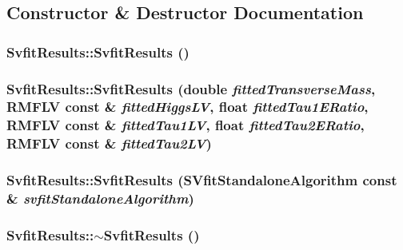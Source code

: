 \subsection{Constructor \& Destructor Documentation}
\hypertarget{classSvfitResults_aacb68d5010cb4ca046f01d846c074fe7}{
\subsubsection[{SvfitResults}]{\setlength{\rightskip}{0pt plus 5cm}SvfitResults::SvfitResults ()}}
\label{classSvfitResults_aacb68d5010cb4ca046f01d846c074fe7}
\hypertarget{classSvfitResults_a8331554fc6ab67e2a2856c61f8b2286a}{
\subsubsection[{SvfitResults}]{\setlength{\rightskip}{0pt plus 5cm}SvfitResults::SvfitResults (double {\em fittedTransverseMass}, \/  RMFLV const \& {\em fittedHiggsLV}, \/  float {\em fittedTau1ERatio}, \/  RMFLV const \& {\em fittedTau1LV}, \/  float {\em fittedTau2ERatio}, \/  RMFLV const \& {\em fittedTau2LV})}}
\label{classSvfitResults_a8331554fc6ab67e2a2856c61f8b2286a}
\hypertarget{classSvfitResults_a949205ecda5ead5d8e5bce308e2a9880}{
\subsubsection[{SvfitResults}]{\setlength{\rightskip}{0pt plus 5cm}SvfitResults::SvfitResults (SVfitStandaloneAlgorithm const \& {\em svfitStandaloneAlgorithm})}}
\label{classSvfitResults_a949205ecda5ead5d8e5bce308e2a9880}
\hypertarget{classSvfitResults_a5b9bcbf6a71d304d800ff5951a023d07}{
\subsubsection[{$\sim$SvfitResults}]{\setlength{\rightskip}{0pt plus 5cm}SvfitResults::$\sim$SvfitResults ()}}
\label{classSvfitResults_a5b9bcbf6a71d304d800ff5951a023d07}



